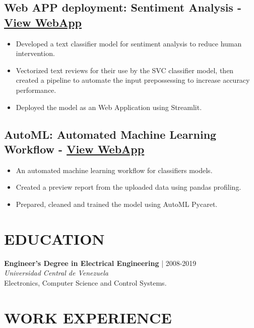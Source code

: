 \documentclass[5pt]{article} %
\def\ucv{Universidad Central de Venezuela}
\begin{document}
\subsection*{Web APP deployment: Sentiment Analysis - \href{https://dquerales-webapp-app-xmgqcu.streamlit.app/}{View WebApp}}
 
\begin{itemize}
\itemsep0em
\item Developed a text classifier model for sentiment analysis to reduce human intervention.
\item Vectorized text reviews for their use by the SVC classifier model, then created a pipeline to automate the input prepossessing to increase accuracy performance.
\item Deployed the model as an Web Application using Streamlit.
\end{itemize}

\subsection*{AutoML: Automated Machine Learning Workflow - \href{https://dquerales-automl-app-c70cuz.streamlit.app/}{View WebApp}}
 
\begin{itemize}
\itemsep0em
\item An automated machine learning workflow for classifiers models.
\item Created a preview report from the uploaded data using pandas profiling.
\item Prepared, cleaned and trained the model using AutoML Pycaret.
\end{itemize}


\section*{EDUCATION}

\textbf{Engineer's Degree in Electrical Engineering} | 2008-2019 \\ 
\emph{\ucv}\\
Electronics, Computer Science and Control Systems.

\section*{WORK EXPERIENCE}
\end{document}
